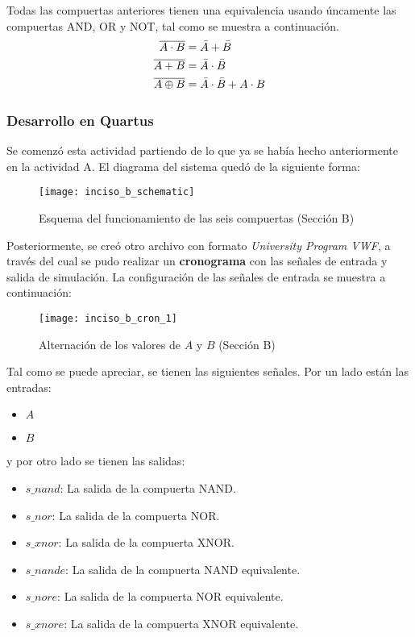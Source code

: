 \documentclass[../procedimientos.tex]{subfiles}
\begin{document}
Todas las compuertas anteriores tienen una equivalencia usando úncamente las 
compuertas AND, OR y NOT, tal como se muestra a continuación.
\begin{align}
  \overline{A \cdot B} &= \bar{A} + \bar{B}\\
  \overline{A + B} &= \bar{A} \cdot \bar{B}\\
  \overline{A \oplus B} &= \bar{A} \cdot \bar{B} + A \cdot B
\end{align}

\subsubsection{Desarrollo en Quartus}
Se comenzó esta actividad partiendo de lo que ya se había hecho anteriormente 
en la actividad A. El diagrama del sistema quedó de la siguiente forma:
\begin{figure}[H]
  \centering
  \texttt{[image: inciso\_b\_schematic]}
  \caption{Esquema del funcionamiento de las seis compuertas (Sección B)}
\end{figure}

Posteriormente, se creó otro archivo con formato \textit{University Program 
VWF}, a través del cual se pudo realizar un \textbf{cronograma} con las 
señales de entrada y salida de simulación. La configuración de las señales de 
entrada se muestra a continuación:
\begin{figure}[H]
  \centering
  \texttt{[image: inciso\_b\_cron\_1]}
  \caption{Alternación de los valores de $A$ y $B$ (Sección B)}
  \label{fig:variables_cron_b}
\end{figure}

Tal como se puede apreciar, se tienen las siguientes señales. Por un lado 
están las entradas:
\begin{itemize}
  \item $A$
  \item $B$
\end{itemize}

y por otro lado se tienen las salidas:
\begin{itemize}
  \item $s\_nand$: La salida de la compuerta NAND.
  \item $s\_nor$: La salida de la compuerta NOR.
  \item $s\_xnor$: La salida de la compuerta XNOR.
  \item $s\_nande$: La salida de la compuerta NAND equivalente.
  \item $s\_nore$: La salida de la compuerta NOR equivalente.
  \item $s\_xnore$: La salida de la compuerta XNOR equivalente.
\end{itemize}
\end{document}
